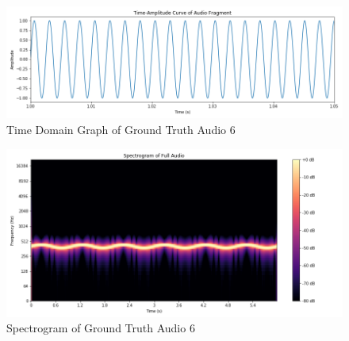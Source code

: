 \documentclass{ioereport}
\begin{document}
    \begin{figure}[H]
        \centering
        \includegraphics[width=\linewidth]{assets/audio_results/fluctuating_tone400time.png}
        \caption{Time Domain Graph of Ground Truth Audio 6}
        \label{fig:gt-fluctuating-time}
    \end{figure}
    \begin{figure}[H]
        \centering
        \includegraphics[width=\linewidth]{assets/audio_results/fluctuating_tone400spec.png}
        \caption{Spectrogram of Ground Truth Audio 6}
        \label{fig:gt-fluctuating-spec}
    \end{figure}
    
\end{document}

